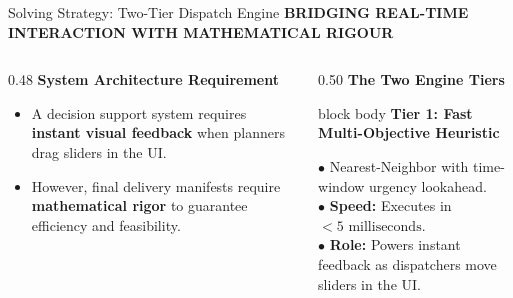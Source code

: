 \documentclass[aspectratio=169,10pt]{beamer}
\newcommand{\sectiontag}[1]{%
    {\scriptsize\bfseries\color{Accent}\MakeUppercase{#1}}\par\vspace{0.08cm}
}
\begin{document}
\begin{frame}{Solving Strategy: Two-Tier Dispatch Engine}
\sectiontag{Bridging Real-Time Interaction with Mathematical Rigour}

\vspace{-0.1cm}

\begin{columns}[T,totalwidth=\textwidth]
    \begin{column}{0.48\textwidth}
        \textbf{\color{Primary}\small System Architecture Requirement}
        \vspace{0.05cm}
        \footnotesize
        \begin{itemize}
            \setlength{\itemsep}{3pt}
            \item A decision support system requires \textbf{instant visual feedback} when planners drag sliders in the UI.
            \item However, final delivery manifests require \textbf{mathematical rigor} to guarantee efficiency and feasibility.
        \end{itemize}

        \vspace{0.2cm}
    \end{column}

    \begin{column}{0.50\textwidth}
        \textbf{\color{Primary}\small The Two Engine Tiers}
        \vspace{0.06cm}

        \begin{beamercolorbox}[rounded=true,shadow=false,wd=\linewidth,sep=4pt]{block body}
            {\bfseries\color{Primary}\scriptsize Tier 1: Fast Multi-Objective Heuristic}\par\vspace{0.02cm}
            \scriptsize
            $\bullet$ Nearest-Neighbor with time-window urgency lookahead.\\
            $\bullet$ \textbf{Speed:} Executes in \textbf{$<5\text{ milliseconds}$}.\\
            $\bullet$ \textbf{Role:} Powers instant feedback as dispatchers move sliders in the UI.
        \end{beamercolorbox}


\end{column}
\end{columns}
\end{frame}
\end{document}
